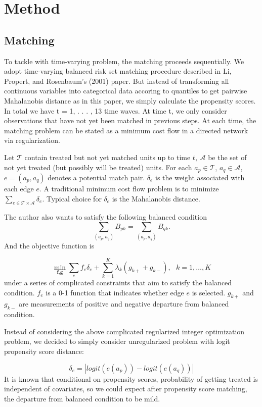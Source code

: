\documentclass[aoas,preprint]{imsart}
\begin{document}
\section{Method}
\subsection{Matching}
To tackle with time-varying problem, the matching proceeds sequentially. We adopt time-varying balanced risk set matching procedure described in Li, Propert, and Rosenbaum’s (2001) paper\cite{r1}. But instead of transforming all continuous variables into categorical data accoring to quantiles to get pairwise Mahalanobis distance as in this paper, we simply calculate the propensity scores. In total we have t = 1, . . . , 13 time waves. At time t, we only consider observations that have not yet been matched in previous steps. At each time, the matching problem can be stated as a minimum cost flow in a directed network via regularization.

Let $\mathcal{T}$ contain  treated but not yet matched units up to time $t$, $\mathcal{A}$ be the set of not yet treated (but possibly will be treated) units. For each $a_p\in\mathcal{T}$, $a_q\in\mathcal{A}$, $e=(a_p, a_q)$ denotes a potential match pair. $\delta_{e}$ is the weight associated with each edge $e$. A traditional minimum cost flow problem is to minimize $\sum_{e\in\mathcal{T}\times\mathcal{A}} \delta_{e}$. Typical choice for $\delta_{e}$ is the Mahalanobis distance.


The author also wants to satisfy the following balanced condition $$\sum_{(a_p, a_q)} B_{pk}=\sum_{(a_p, a_q)} B_{qk}.$$ And the objective function is


$$\min_{\textbf{f},\textbf{g}}\sum_{e}f_e\delta_e+\sum_{k=1}^K \lambda_k(g_{k+}+g_{k-}), \text{ } k=1,\dots,K$$
under a series of complicated constraints that aim to satisfy the balanced condition. $f_e$ is a 0-1 function that indicates whether edge $e$ is selected. $g_{k+}$ and $g_{k-}$ are measurements of positive and negative departure from balanced condition.

Instead of considering the above complicated regularized integer optimization problem, we decided to simply consider unregularized problem with logit propensity score distance:

$$\delta_e=|logit(e(a_p))-logit(e(a_q))|$$
It is known that conditional on propensity scores, probability of getting treated is independent of covariates, so we could expect after propensity score matching, the departure from balanced condition to be mild.
\end{document}
